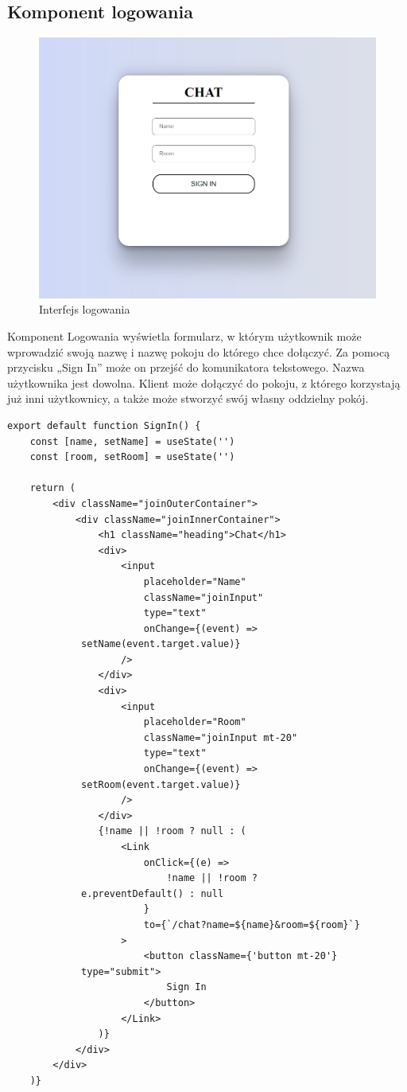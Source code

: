 \subsection{Komponent logowania}
\begin{figure}[htbp]
	\centering
	\includegraphics[width=0.5\linewidth]{"obrazy/logowanie"}
	\caption{Interfejs logowania}
	\label{fig:7}
\end{figure}
Komponent Logowania wyświetla formularz, w którym użytkownik może wprowadzić swoją nazwę i nazwę pokoju do którego chce dołączyć. Za pomocą przycisku „Sign In” może on przejść do komunikatora tekstowego. Nazwa użytkownika jest dowolna. Klient może dołączyć do pokoju, z którego korzystają już inni użytkownicy, a także może stworzyć swój własny oddzielny pokój. 
\newpage
\begin{lstlisting}[caption=Implementacja komponentu logowania]
export default function SignIn() {
    const [name, setName] = useState('')
    const [room, setRoom] = useState('')

    return (
        <div className="joinOuterContainer">
            <div className="joinInnerContainer">
                <h1 className="heading">Chat</h1>
                <div>
                    <input
                        placeholder="Name"
                        className="joinInput"
                        type="text"
                        onChange={(event) =>
			 setName(event.target.value)}
                    />
                </div>
                <div>
                    <input
                        placeholder="Room"
                        className="joinInput mt-20"
                        type="text"
                        onChange={(event) =>
			 setRoom(event.target.value)}
                    />
                </div>
                {!name || !room ? null : (
                    <Link
                        onClick={(e) =>
                            !name || !room ?
			 e.preventDefault() : null
                        }
                        to={`/chat?name=${name}&room=${room}`}
                    >
                        <button className={'button mt-20'}
			 type="submit">
                            Sign In
                        </button>
                    </Link>
                )}
            </div>
        </div>
    )}
\end{lstlisting}
